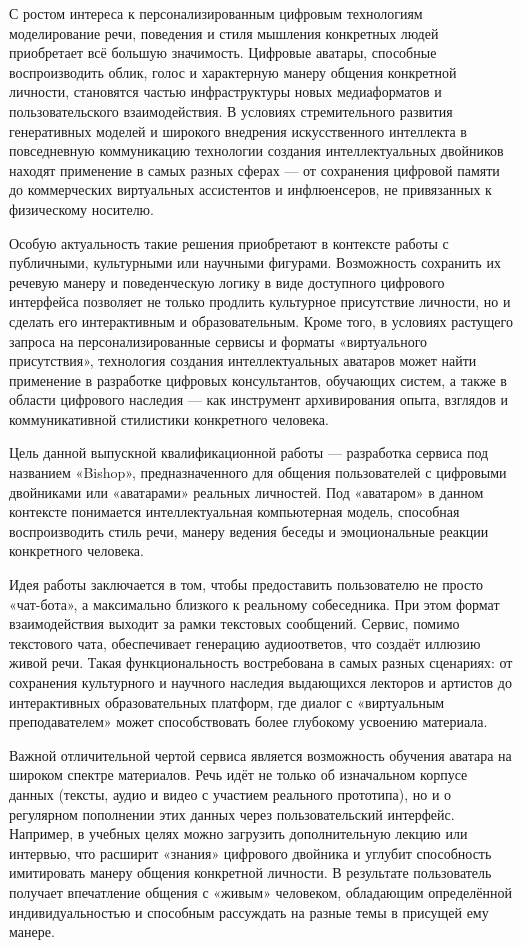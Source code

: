 
С ростом интереса к персонализированным цифровым технологиям моделирование речи, поведения  
и стиля мышления конкретных людей приобретает всё большую значимость. Цифровые аватары,  
способные воспроизводить облик, голос и характерную манеру общения конкретной личности,  
становятся частью инфраструктуры новых медиаформатов и пользовательского взаимодействия.  
В условиях стремительного развития генеративных моделей и широкого внедрения искусственного  
интеллекта в повседневную коммуникацию технологии создания интеллектуальных двойников  
находят применение в самых разных сферах — от сохранения цифровой памяти до коммерческих  
виртуальных ассистентов и инфлюенсеров, не привязанных к физическому носителю.

Особую актуальность такие решения приобретают в контексте работы с публичными, культурными  
или научными фигурами. Возможность сохранить их речевую манеру и поведенческую логику в виде  
доступного цифрового интерфейса позволяет не только продлить культурное присутствие личности,  
но и сделать его интерактивным и образовательным. Кроме того, в условиях растущего запроса на  
персонализированные сервисы и форматы «виртуального присутствия», технология создания  
интеллектуальных аватаров может найти применение в разработке цифровых консультантов,  
обучающих систем, а также в области цифрового наследия — как инструмент архивирования опыта,  
взглядов и коммуникативной стилистики конкретного человека.

Цель данной выпускной квалификационной работы — разработка сервиса под названием «Bishop»,  
предназначенного для общения пользователей с цифровыми двойниками или «аватарами» реальных  
личностей. Под «аватаром» в данном контексте понимается интеллектуальная компьютерная модель,  
способная воспроизводить стиль речи, манеру ведения беседы и эмоциональные реакции конкретного  
человека.

Идея работы заключается в том, чтобы предоставить пользователю не просто «чат-бота»,  
а максимально близкого к реальному собеседника. При этом формат взаимодействия выходит за рамки  
текстовых сообщений. Сервис, помимо текстового чата, обеспечивает генерацию аудиоответов,  
что создаёт иллюзию живой речи. Такая функциональность востребована в самых разных сценариях:  
от сохранения культурного и научного наследия выдающихся лекторов и артистов до интерактивных  
образовательных платформ, где диалог с «виртуальным преподавателем» может способствовать более  
глубокому усвоению материала.

Важной отличительной чертой сервиса является возможность обучения аватара на широком спектре  
материалов. Речь идёт не только об изначальном корпусе данных (тексты, аудио и видео с участием  
реального прототипа), но и о регулярном пополнении этих данных через пользовательский интерфейс.  
Например, в учебных целях можно загрузить дополнительную лекцию или интервью, что расширит  
«знания» цифрового двойника и углубит способность имитировать манеру общения конкретной  
личности. В результате пользователь получает впечатление общения с «живым» человеком,  
обладающим определённой индивидуальностью и способным рассуждать на разные темы  
в присущей ему манере.

